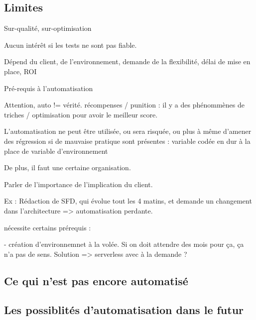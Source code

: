 \subsection*{Limites}



Sur-qualité, sur-optimisation

Aucun intérêt si les tests ne sont pas fiable.

Dépend du client, de l'environnement, demande de la flexibilité, délai de mise en place, ROI

Pré-requis à l'automatisation

Attention, auto != vérité. récompenses / punition : il y a des phénommènes de triches / optimisation pour avoir le meilleur score.

L'automatisation ne peut être utilisée, ou sera risquée, ou plus à même d'amener des régression si de mauvaise pratique sont présentes : variable codée en dur à la place de variable d'environnement

De plus, il faut une certaine organisation.

Parler de l'importance de l'implication du client. 

Ex :  Rédaction de SFD, qui évolue tout les 4 matins, et demande un changement dans l'architecture => automatisation perdante.

nécessite certains prérequis : 

- création d'environnemnet à la volée. Si on doit attendre des mois pour ça, ça n'a pas de sens. Solution => serverless avec à la demande ? 

\subsection*{Ce qui n'est pas encore automatisé}


\subsection*{Les possiblités d'automatisation dans le futur}



